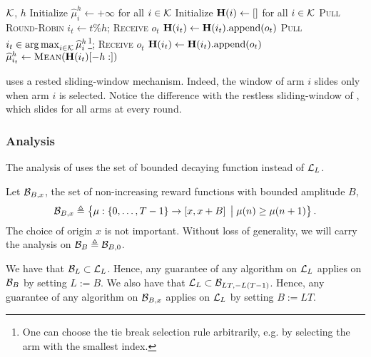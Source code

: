 \begin{minipage}{\textwidth}
\renewcommand*\footnoterule{}
\begin{savenotes}
\begin{algorithm}[H]
\caption{\SWA \citep{levine2017rotting} }
\label{alg:SWA}
\begin{algorithmic}[1]
\Require $\mathcal{K}$, $h$
\State Initialize $\hat{\mu}_{i}^h \leftarrow + \infty$ for all $i \in \mathcal{K}$
\State Initialize $\mathbf{H}(i) \leftarrow []$ for all $i \in \mathcal{K}$
	 	\State \textsc{Pull Round-Robin}  $i_t \gets t \% h $; \textsc{Receive} $o_{t}$
	 	\State $\mathbf{H}(i_t) \leftarrow \mathbf{H}(i_t)\text{.append}(o_{t})$
	\EndFor
		\State \textsc{Pull}  $i_t \in \operatorname*{arg\,max}_{i \in \mathcal{K}} \widehat{\mu}_{i}^h$\footnote{One can choose the tie break selection rule arbitrarily, e.g. by selecting the arm with the smallest index.}; \textsc{Receive} $o_{t}$
		\State $\mathbf{H}(i_t) \leftarrow \mathbf{H}(i_t)\text{.append}(o_{t})$
		\State $\widehat{\mu}_{i_t}^h \leftarrow \textsc{Mean}(\mathbf{H}(i_t)[-h:])$
		\EndIf
	\EndFor
\end{algorithmic}
\end{algorithm}
\end{savenotes}
\end{minipage}
\begin{remark}
\SWA uses a rested sliding-window mechanism. Indeed, the window of arm $i$ slides only when arm $i$ is selected. Notice the difference with the restless sliding-window of \SWUCB \citep{garivier2011upper-confidence-bound}, which slides for all arms at every round.
\end{remark}
%
\subsubsection*{Analysis}

The analysis of \citet{levine2017rotting} uses the set of bounded decaying function instead of $\mathcal{L}_L$. 

\begin{definition}\label{def:rew-bounded} 
Let $\mathcal{B}_{B,x}$, the set of non-increasing reward functions with bounded amplitude $B$,
\[ 
\mathcal{B}_{B,x} \triangleq \left\{ \mu : \left\{0, \dots, T-1 \right\} \rightarrow \left[x , x +B\right] \;\big{|}\; \mu(n) \geq \mu(n+1)  \right\}.
\]
The choice of origin $x$ is not important. Without loss of generality, we will carry the analysis on $\mathcal{B}_{B} \triangleq \mathcal{B}_{B,0}$. 
\end{definition}
\begin{remark}
\label{rem:BBvsLL}
We have that $\mathcal{B}_L \subset \mathcal{L}_L$. Hence, any guarantee of any algorithm on $\mathcal{L}_L$ applies on $\mathcal{B}_{B}$ by setting $L := B$. We also have that $\mathcal{L}_L \subset \mathcal{B}_{LT, -L\left(T-1\right)}$. Hence, any guarantee of any algorithm on $\mathcal{B}_{B,x}$ applies on $\mathcal{L}_L$ by setting $B := LT$.
\end{remark}

